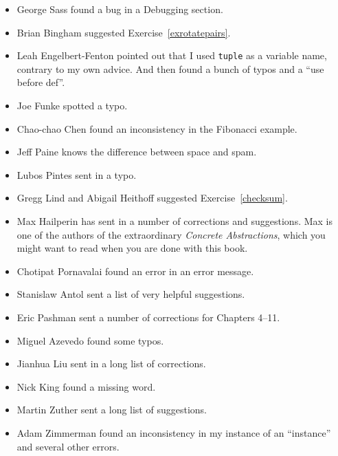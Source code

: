 \begin{itemize}
\item George Sass found a bug in a Debugging section.

\item Brian Bingham suggested Exercise~\ref{exrotatepairs}.

\item Leah Engelbert-Fenton pointed out that I used \texttt{tuple}
as a variable name, contrary to my own advice.  And then found
a bunch of typos and a ``use before def''.

\item Joe Funke spotted a typo.

\item Chao-chao Chen found an inconsistency in the Fibonacci example.

\item Jeff Paine knows the difference between space and spam.

\item Lubos Pintes sent in a typo.

\item Gregg Lind and Abigail Heithoff suggested Exercise~\ref{checksum}.

\item Max Hailperin has sent in a number of corrections and
  suggestions.  Max is one of the authors of the extraordinary {\em
    Concrete Abstractions}, which you might want to read when you are
  done with this book.

\item Chotipat Pornavalai found an error in an error message.

\item Stanislaw Antol sent a list of very helpful suggestions.

\item Eric Pashman sent a number of corrections for Chapters 4--11.

\item Miguel Azevedo found some typos.

\item Jianhua Liu sent in a long list of corrections.

\item Nick King found a missing word.

\item Martin Zuther sent a long list of suggestions.

\item Adam Zimmerman found an inconsistency in my instance
of an ``instance'' and several other errors.


\end{itemize}

